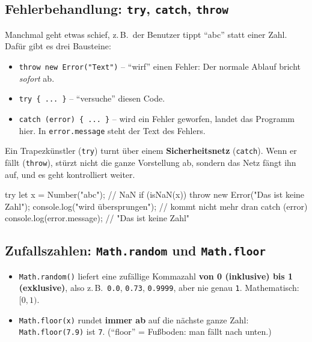 \documentclass[a4paper,11pt]{article}
\begin{document}
\subsection{Fehlerbehandlung: \texttt{try}, \texttt{catch}, \texttt{throw}}

Manchmal geht etwas schief, z.\,B.\ der Benutzer tippt "`abc"' statt einer Zahl. Dafür gibt es drei Bausteine:
\begin{itemize}[nosep]
\item \lstinline|throw new Error("Text")| -- "`wirf"' einen Fehler: Der normale Ablauf bricht \emph{sofort} ab.
\item \lstinline|try { ... }| -- "`versuche"' diesen Code.
\item \lstinline|catch (error) { ... }| -- wird ein Fehler geworfen, landet das Programm hier.
      In \lstinline|error.message| steht der Text des Fehlers.
\end{itemize}

\begin{analogie}
Ein Trapezkünstler (\texttt{try}) turnt über einem \textbf{Sicherheitsnetz} (\texttt{catch}). Wenn er fällt
(\texttt{throw}), stürzt nicht die ganze Vorstellung ab, sondern das Netz fängt ihn auf, und es geht kontrolliert weiter.
\end{analogie}

\begin{code}
try {
    let x = Number("abc");                // NaN
    if (isNaN(x)) {
        throw new Error("Das ist keine Zahl");
    }
    console.log("wird übersprungen");     // kommt nicht mehr dran
} catch (error) {
    console.log(error.message);           // "Das ist keine Zahl"
}
\end{code}

\subsection{Zufallszahlen: \texttt{Math.random} und \texttt{Math.floor}}\label{sec:zufall}

\begin{itemize}[nosep]
\item \lstinline|Math.random()| liefert eine zufällige Kommazahl \textbf{von 0 (inklusive) bis 1 (exklusive)},
      also z.\,B.\ \texttt{0.0}, \texttt{0.73}, \texttt{0.9999}, aber nie genau \texttt{1}. Mathematisch: $[0, 1)$.
\item \lstinline|Math.floor(x)| rundet \textbf{immer ab} auf die nächste ganze Zahl: \texttt{Math.floor(7.9)} ist \texttt{7}.
      ("`floor"' = Fußboden: man fällt nach unten.)
\end{itemize}
\end{document}

